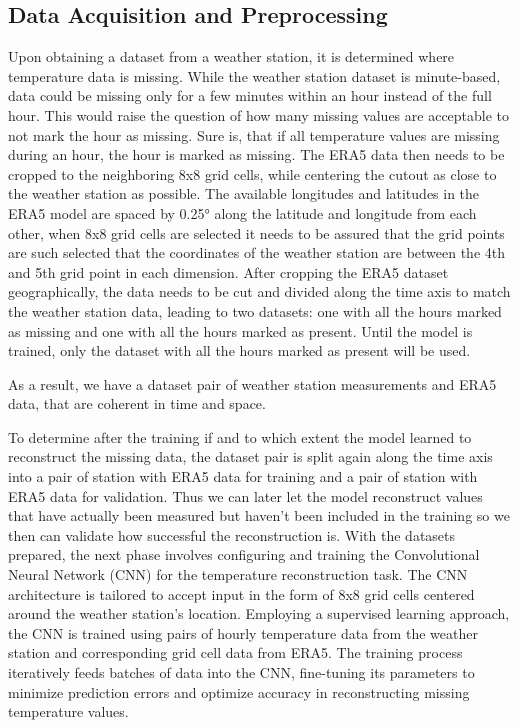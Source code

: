 \subsection{Data Acquisition and Preprocessing}
\label{subsec: data_preprocessing}
Upon obtaining a dataset from a weather station, it is determined where temperature data is missing.
While the weather station dataset is minute-based, data could be missing only for a few minutes within an hour instead of the full hour.
This would raise the question of how many missing values are acceptable to not mark the hour as missing.
Sure is, that if all temperature values are missing during an hour, the hour is marked as missing.
The ERA5 data then needs to be cropped to the neighboring 8x8 grid cells, while centering the cutout as close to the weather station as possible.
The available longitudes and latitudes in the ERA5 model are spaced by 0.25° along the latitude and longitude from each other, when 8x8 grid cells are selected it needs to be assured that the grid points are such selected that the coordinates of the weather station are between the 4th and 5th grid point in each dimension.
After cropping the ERA5 dataset geographically, the data needs to be cut and divided along the time axis to match the weather station data, leading to two datasets: one with all the hours marked as missing and one with all the hours marked as present.
Until the model is trained, only the dataset with all the hours marked as present will be used.

As a result, we have a dataset pair of weather station measurements and ERA5 data, that are coherent in time and space.

To determine after the training if and to which extent the model learned to reconstruct the missing data, the dataset pair is split again along the time axis into a pair of station with ERA5 data for training and a pair of station with ERA5 data for validation.
Thus we can later let the model reconstruct values that have actually been measured but haven't been included in the training so we then can validate how successful the reconstruction is.
With the datasets prepared, the next phase involves configuring and training the Convolutional Neural Network (CNN) for the temperature reconstruction task.
The CNN architecture is tailored to accept input in the form of 8x8 grid cells centered around the weather station's location.
Employing a supervised learning approach, the CNN is trained using pairs of hourly temperature data from the weather station and corresponding grid cell data from ERA5.
The training process iteratively feeds batches of data into the CNN, fine-tuning its parameters to minimize prediction errors and optimize accuracy in reconstructing missing temperature values.


